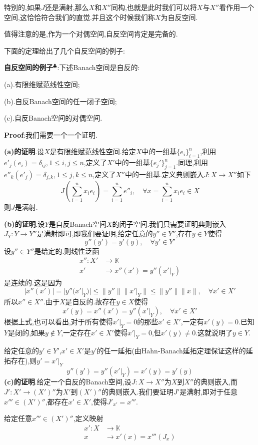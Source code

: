 特别的,如果$J$还是满射,那么$X$和$X''$同构,也就是此时我们可以将$X$与$X''$看作用一个空间,这恰恰符合我们的直觉.并且这个时候我们称$X$为自反空间.\par
值得注意的是,作为一个对偶空间,自反空间肯定是完备的.\par
下面的定理给出了几个自反空间的例子:\par
\textbf{自反空间的例子}$^\clubsuit $:下述Banach空间是自反的:\par
(a).有限维赋范线性空间;\par
(b).自反Banach空间的任一闭子空间;\par
(c).自反Banach空间的对偶空间.\par
\textbf{Proof}:我们需要一个一个证明.\par
\textbf{(a)的证明}.设$X$是有限维赋范线性空间.给定$X$中的一组基$\{e_i\}^n_{i=1}$,利用$e'_j(e_i)=\delta_{ij},1\leqslant i,j\leqslant n$,定义了$X'$中的一组基$\{e_j'\}^n_{j=1}$.同理,利用$e''_k(e'_j)=\delta_{j,k},1\leqslant j,k\leqslant n$,定义了$X''$中的一组基.定义典则嵌入$J:X\to X''$如下
$$
J\left(\sum_{i=1}^{n}x_ie_i\right)=\sum^n_{i=1}e''_i,\quad \forall x=\sum_{i=1}^{n}x_ie_i\in X
$$
则$J$是满射.\par
\textbf{(b)的证明}.设$Y$是自反Banach空间$X$的闭子空间.我们只需要证明典则嵌入$J_{Y}:Y\to Y''$是满射即可,即我们要证明,给定任意的$y''\in Y''$,存在$y\in Y$使得
$$
y''(y')=y'(y),\quad \forall y'\in Y'
$$
\qquad 设$y''\in Y''$是给定的.则线性泛函
$$
\begin{aligned}
    x'':X' &\to \mathbb{K}\\
        x' &\to x''(x')=y''(x'|_{Y})
\end{aligned}
$$
是连续的.这是因为
$$
|x''(x')|=|y''(x'|_{Y})|\leqslant \|y''\|\|x'|_{Y}\|\leqslant \|y''\|\|x\|,\quad \forall x'\in X'
$$
所以$x''\in X''$.由于$X$是自反的.故存在$y\in X$使得
$$
x'(y)=x''(x')=y''(x'|_{Y}),\quad \forall x'\in X'
$$
根据上式,也可以看出,对于所有使得$x'|_{Y}=0$的那些$x'\in X'$,一定有$x'(y)=0$.已知$Y$是闭的,如果$y\notin Y$,一定存在$x'\in X'$使得$x'|_{Y}=0$,但$x'(y)\neq 0$.这就说明了$y\in Y$.\par
给定任意的$y'\in Y'$,$x'\in X'$是$y'$的任一延拓(由Hahn-Banach延拓定理保证这样的延拓存在),则$y'=x'|_{Y}$
$$
y''(y')=y''(x'|_{Y})=x'(y)=y'(y)
$$
\qquad \textbf{(c)的证明}.给定一个自反的Banach空间,设$J:X\to X''$为$X$到$X''$的典则嵌入,而$J':X'\to (X')''$为$X'$到$(X')''$的典则嵌入.我们要证明$J'$是满射,即对于任意$x'''\in (X')''$,都存在$x'\in X'$,使得$J'_{x'}=x'''$.\par
给定任意$x'''\in (X')''$,定义映射
$$
\begin{aligned}
    x':X &\to \mathbb{K}\\
        x &\to x'(x)=x'''(J_{x})
\end{aligned}
$$
